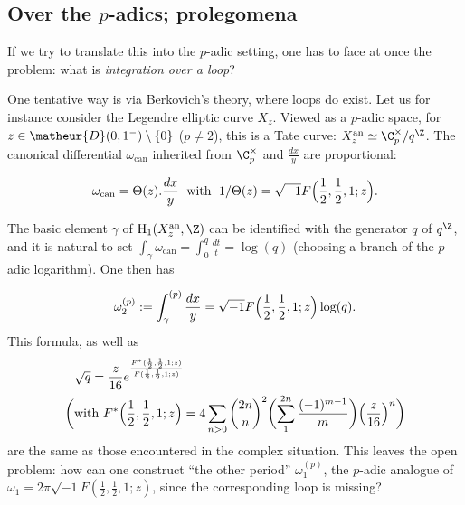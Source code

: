 \subsection{Over the $p$-adics; prolegomena}\label{sub-prolegomena}

If we try to translate this into the $p$-adic setting, one has to face
at once the problem: what is \emph{integration over a loop}?

\begin{para}\label{para-padic-int-1}
 One tentative way is via Berkovich's theory, where loops do exist.  Let us for
 instance consider the Legendre elliptic curve $X_z$. Viewed as a
 $p$-adic space, for $z \in \matheur{D}(0,1^-)\setminus \lbrace 0 \rbrace$
 ($p\neq 2$), this is a Tate curve: $X_z^{\mathrm{an}} \simeq
 {\C}_p^{\times}/q^{\Z}$. The canonical differential
 $\omega_{\mathrm{can}}$ inherited from ${\C}_p^{\times}$ and
 $\frac{dx}{y}$ are proportional:

 \begin{equation*}
 \omega_{\mathrm{can}}=\Theta(z).\frac{dx}{y} \;\text{ with }\;
 1/\Theta(z)=\sqrt{-1}F\Bigl(\frac{1}{2},\frac{1}{2},1;z\Bigr).
 \end{equation*}

 The basic element $\gamma$ of $\mathrm{H}_1(X_z^{\mathrm{an}},{\Z})$
 can be identified with the generator $q$ of $q^{\Z}$, and it is natural
 to set $\int_{\gamma}\omega_{\mathrm{can}}=\int_{0}^q \frac{dt}{t}=
 \log(q)$ (choosing a branch of the $p$-adic logarithm). One then has

 \begin{equation*}
 \omega_2^{(p)}:=\int_{\gamma}^{(p)}\frac{dx}{y} =
 \sqrt{-1}F\Bigl(\frac{1}{2},\frac{1}{2},1;z\Bigr)\log(q).
 \end{equation*}
 This formula, as well as
 \begin{align*}
 & \sqrt{q} =
 \frac{z}{16}
 e^{\frac{F^{\ast}(\frac{1}{2},\frac{1}{2},1;z)}
         {F(\frac{1}{2},\frac{1}{2},1;z)}}\\
 \biggl( & \text{with }F^{\ast}\Bigl(\frac{1}{2},\frac{1}{2},1;z\Bigr)
  = 4\sum_{n>0}\binom{2n}{n}^2 \biggl(\sum_1^{2n} \frac{(-1)^{m-1}}{m}\biggr) 
 \Bigl(\frac{z}{16}\Bigr)^n\biggr)
 \end{align*}
 are the same as those encountered in the complex situation. This leaves
 the open problem: how can one construct ``the other period''
 $\omega_1^{(p)}$, \ie the $p$-adic analogue of
 $\omega_1=2\pi\sqrt{-1}F(\frac{1}{2},\frac{1}{2},1;z)$, since the
 corresponding loop is missing?
\end{para}

